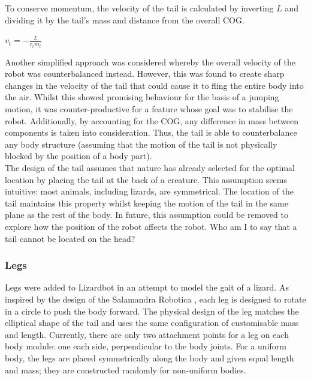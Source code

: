\documentclass{article}
\begin{document}
To conserve momentum, the velocity of the tail is calculated by inverting $L$ and dividing it by the tail's mass and distance from the overall COG.
\begin{center}
\begin{Large}
$v_{t} = - \frac{L}{r_{t}m_{t}}$\\
\end{Large}
\end{center}

Another simplified approach was considered whereby the overall velocity of the robot was counterbalanced instead. However, this was found to create sharp changes in the velocity of the tail that could cause it to fling the entire body into the air. Whilst this showed promising behaviour for the basis of a jumping motion, it was counter-productive for a feature whose goal was to stabilise the robot. Additionally, by accounting for the COG, any difference in mass between components is taken into consideration. Thus, the tail is able to counterbalance any body structure (assuming that the motion of the tail is not physically blocked by the position of a body part).\\

The design of the tail assumes that nature has already selected for the optimal location by placing the tail at the back of a creature. This assumption seems intuitive: most animals, including lizards, are symmetrical. The location of the tail maintains this property whilst keeping the motion of the tail in the same plane as the rest of the body. In future, this assumption could be removed to explore how the position of the robot affects the robot. Who am I to say that a tail cannot be located on the head?

\subsubsection{Legs}
\label{sec:Legs Imp}
Legs were added to Lizardbot in an attempt to model the gait of a lizard.
As inspired by the design of the Salamandra Robotica , each leg is designed to rotate in a circle to push the body forward. The physical design of the leg matches the elliptical shape of the tail and uses the same configuration of customisable mass and length. 
Currently, there are only two attachment points for a leg on each body module: one each side, perpendicular to the body joints. For a uniform body, the legs are placed symmetrically along the body and given equal length and mass; they are constructed randomly for non-uniform bodies. \\
\end{document}
